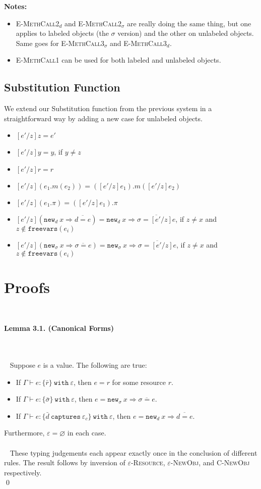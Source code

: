 \documentclass{llncs}
\newcommand{\keywadj}[1]{\mathtt{#1}}
\newcommand{\keyw}[1]{\keywadj{#1}~}
\newcommand{\thm}[3]{
	\begin{large}
		\bf{#1}
	\end{large} \\\\
	\fbox{Statement.} ~ #2
	\fbox{Proof.}~ #3 \qed
}
\newcommand{\type}[2]{
	#1~\keyw{with} #2
}
\newcommand{\newd}[0]{
	\keywadj{new}_d~x \Rightarrow \overline{d = e}
}
\newcommand{\newsig}[0]{
	\keywadj{new}_\sigma~x \Rightarrow \overline{\sigma = e}
}
\begin{document}
\noindent \textbf{Notes:}
\begin{itemize}
	\item \textsc{E-MethCall2$_d$} and \textsc{E-MethCall2$_\sigma$} are really doing the same thing, but one applies to labeled objects (the $\sigma$ version) and the other on unlabeled objects. Same goes for \textsc{E-MethCall3$_\sigma$} and \textsc{E-MethCall3$_d$}.
	\item \textsc{E-MethCall1} can be used for both labeled and unlabeled objects.
\end{itemize}


\subsection{Substitution Function}


\noindent
We extend our Substitution function from the previous system in a straightforward way by adding a new case for unlabeled objects.

\begin{itemize}
	\item $[e'/z]z = e'$
	\item $[e'/z]y = y$, if $y \neq z$
	\item $[e'/z]r = r$
	\item $[e'/z](e_1.m(e_2)) = ([e'/z]e_1).m([e'/z]e_2)$
	\item $[e'/z](e_1.\pi) = ([e'/z]e_1).\pi$
	\item $[e'/z](\newd) = \keywadj{new}_d~x \Rightarrow \overline{ \sigma = [e'/z]e }$, if $z \neq x$ and $z \notin \keywadj{freevars}(e_i)$
	\item $[e'/z](\newsig) = \keywadj{new}_\sigma~x \Rightarrow \overline{ \sigma = [e'/z]e }$, if $z \neq x$ and $z \notin \keywadj{freevars}(e_i)$
\end{itemize}


\section{Proofs}
~


\thm{Lemma 3.1. (Canonical Forms)}
{Suppose $e$ is a value. The following are true:
	\begin{itemize}
	\item If $\Gamma \vdash e : \type{ \{ \bar r \} }{\varepsilon} $, then $e = r$ for some resource $r$.
	\item If $\Gamma \vdash e : \type{ \{ \bar \sigma \}}{\varepsilon}$, then $e = \newsig$.
	\item If $\Gamma \vdash e : \{ \bar d~\keyw{captures} \varepsilon_c \}~ \keyw{with} \varepsilon$, then $e = \keywadj{new}_{d}~x \Rightarrow \overline{ d = e }$.
	\end{itemize}
Furthermore, $\varepsilon = \varnothing$ in each case. \\\\
}
{ These typing judgements each appear exactly once in the conclusion of different rules. The result follows by inversion of \textsc{$\varepsilon$-Resource}, \textsc{$\varepsilon$-NewObj}, and \textsc{C-NewObj} respectively. \\
}
\end{document}
